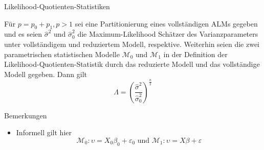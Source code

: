 \documentclass[
  8pt,
  ignorenonframetext,
]{beamer}
\providecommand{\tightlist}{%
  \setlength{\itemsep}{0pt}\setlength{\parskip}{0pt}}
\begin{document}
\begin{frame}{Likelihood-Quotienten-Statistiken}
\protect\hypertarget{likelihood-quotienten-statistiken-3}{}
\footnotesize
\begin{theorem}
\justifying
\normalfont
Für $p = p_0 + p_1, p > 1$ sei eine Partitionierung eines vollständigen ALMs 
gegeben und es seien $\hat{\sigma}^2$ und $\hat{\sigma}^2_0$ die Maximum-Likelihood Schätzer
des Varianzparameters unter vollständigem und reduziertem Modell, respektive.
Weiterhin seien die zwei parametrischen statistischen Modelle $\mathcal{M}_0$ 
und $\mathcal{M}_1$ in der Definition der Likelihood-Quotienten-Statistik durch das 
reduzierte Modell und das vollständige Modell gegeben. 
Dann gilt
\begin{equation}
\Lambda = \left(\frac{\hat{\sigma}^2}{\hat{\sigma}_0^2}\right)^{\frac{n}{2}}
\end{equation}
\end{theorem}

Bemerkungen

\begin{itemize}
\tightlist
\item
  Informell gilt hier \begin{equation}
  \mathcal{M}_0 : \upsilon = X_0\beta_0 + \varepsilon_0 \mbox{ und } \mathcal{M}_1 : \upsilon = X\beta + \varepsilon
  \end{equation}
\end{itemize}
\end{frame}
\end{document}
